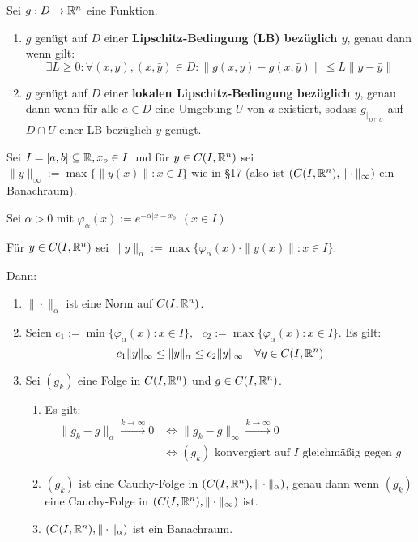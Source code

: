 \documentclass[a4paper,twoside,DIV15,BCOR12mm,chapterprefix=true,headings=twolinechapter]{scrbook}
\begin{document}
\begin{definition}
Sei $g: D \to \mathbb{R}^n$ eine Funktion.
\begin{enumerate}
\item $g$ genügt auf $D$ einer \textbf{Lipschitz-Bedingung (LB) bezüglich $y$},
genau dann wenn gilt:
\[\exists L \ge 0:\forall (x,y), (x,\bar y ) \in D: \|g(x,y)-g(x,\bar y)\| \le L \|y-\bar y \|\]
\item $g$ genügt auf $D$ einer \textbf{lokalen Lipschitz-Bedingung bezüglich $y$},
genau dann wenn für alle $a \in D$ eine Umgebung $U$ von $a$ existiert, sodass 
$g_{|_{D \cap U}}$ auf $D \cap U$ einer LB bezüglich $y$ genügt.
\end{enumerate}
\end{definition}

\begin{satz}
Sei $I = [a,b] \subseteq \mathbb{R}, x_o \in I$ und für $y\in C(I, \mathbb{R}^n)$ sei $\|y\|_\infty := \max \{\|y(x)\| : x\in I \}$ wie in §17 (also ist $(C(I, \mathbb{R}^n), \|\cdot \|_\infty )$ ein Banachraum).

Sei $\alpha > 0$ mit $\varphi_\alpha (x) := e^{-\alpha |x-x_0|}\ (x \in I)$.

Für $y \in C(I, \mathbb{R}^n)$ sei $\|y\|_\alpha := \max \{\varphi_\alpha(x)\cdot \|y(x)\| : x\in I \}$.

Dann:
\begin{enumerate}
\item $\|\cdot\|_\alpha$ ist eine Norm auf $C(I,\mathbb{R}^n)$.
\item Seien $c_1 := \min \{ \varphi_\alpha(x) : x \in I \},\text{ } c_2 := \max \{ \varphi_\alpha(x) : x \in I \}$. Es gilt: 
\[c_1\|y\|_\infty \leq \|y\|_\alpha \leq c_2 \|y\|_\infty \quad \forall y \in C(I, \mathbb{R}^n)\]

\item Sei $(g_k)$ eine Folge in $C(I,\mathbb{R}^n)$ und $g \in C(I, \mathbb{R}^n)$.
\begin{enumerate}
\item Es gilt:
\begin{align*}
\|g_k -g\|_\alpha \stackrel{k \to \infty}\to 0 &\iff \|g_k - g\|_\infty \stackrel{k \to \infty}\to 0\\
&\iff (g_k)\text{ konvergiert auf $I$ gleichmäßig gegen $g$}
\end{align*}
\item $(g_k)$ ist eine Cauchy-Folge in $(C(I,\mathbb{R}^n), \|\cdot \|_\alpha)$, genau dann
wenn $(g_k)$ eine Cauchy-Folge in $(C(I,\mathbb{R}^n), \|\cdot \|_\infty)$ ist.
\item $(C(I,\mathbb{R}^n), \|\cdot \|_\alpha)$ ist ein Banachraum.
\end{enumerate}
\end{enumerate}
\end{satz}
\end{document}
